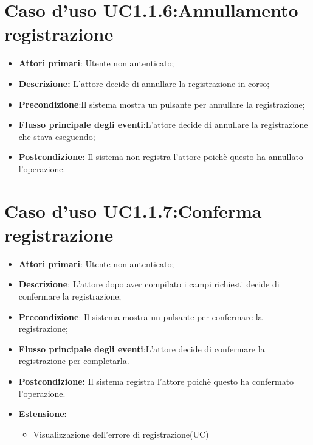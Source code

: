 {{{\section{Caso d'uso UC1.1.6:Annullamento registrazione}
\begin{itemize}
	\item \textbf{Attori primari}: Utente non autenticato;
	\item \textbf{Descrizione:} L'attore decide di annullare la registrazione in corso;
	\item \textbf{Precondizione}:Il sistema mostra un pulsante per annullare la  registrazione;
	\item \textbf{Flusso principale degli eventi}:L'attore decide di annullare la registrazione che stava eseguendo;
	\item \textbf{Postcondizione}: Il sistema non registra l'attore poichè questo ha annullato l'operazione.
\end{itemize}

\section{Caso d'uso UC1.1.7:Conferma registrazione}
\begin{itemize}
	\item \textbf{Attori primari}: Utente non autenticato;
	\item \textbf{Descrizione}: L'attore dopo aver compilato i campi richiesti decide di confermare  la registrazione;
	\item \textbf{Precondizione}: Il sistema mostra un pulsante per confermare la registrazione;
	\item \textbf{Flusso principale degli eventi}:L'attore decide di confermare la registrazione per completarla.
	\item \textbf{Postcondizione:} Il sistema registra l'attore poichè questo ha confermato l'operazione.
	\item \textbf{Estensione:}
	\begin{itemize}
		\item Visualizzazione dell'errore di registrazione(UC)
	\end{itemize}
\end{itemize}

}}}
